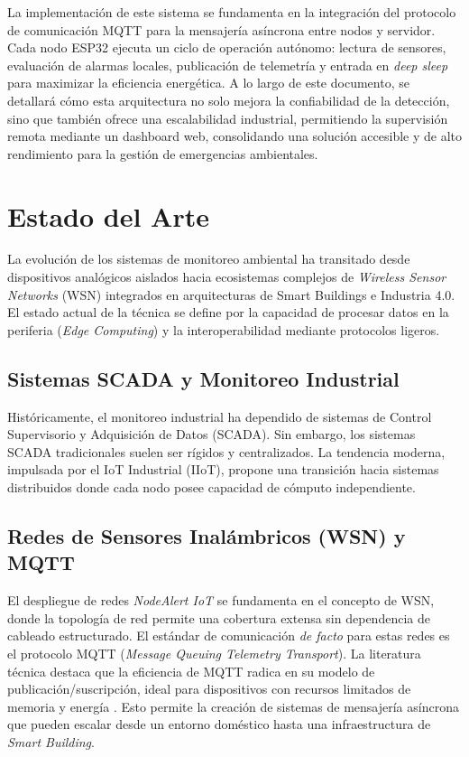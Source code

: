 \documentclass[11pt,a4paper]{article}
\begin{document}
La implementación de este sistema se fundamenta en la integración del protocolo de comunicación MQTT para la mensajería asíncrona entre nodos y servidor. Cada nodo ESP32 ejecuta un ciclo de operación autónomo: lectura de sensores, evaluación de alarmas locales, publicación de telemetría y entrada en \textit{deep sleep} para maximizar la eficiencia energética. A lo largo de este documento, se detallará cómo esta arquitectura no solo mejora la confiabilidad de la detección, sino que también ofrece una escalabilidad industrial, permitiendo la supervisión remota mediante un dashboard web, consolidando una solución accesible y de alto rendimiento para la gestión de emergencias ambientales.

\section{Estado del Arte}
La evolución de los sistemas de monitoreo ambiental ha transitado desde dispositivos analógicos aislados hacia ecosistemas complejos de \textit{Wireless Sensor Networks} (WSN) integrados en arquitecturas de Smart Buildings e Industria 4.0. El estado actual de la técnica se define por la capacidad de procesar datos en la periferia (\textit{Edge Computing}) y la interoperabilidad mediante protocolos ligeros.

\subsection{Sistemas SCADA y Monitoreo Industrial}
Históricamente, el monitoreo industrial ha dependido de sistemas de Control Supervisorio y Adquisición de Datos (SCADA). Sin embargo, los sistemas SCADA tradicionales suelen ser rígidos y centralizados. La tendencia moderna, impulsada por el IoT Industrial (IIoT), propone una transición hacia sistemas distribuidos donde cada nodo posee capacidad de cómputo independiente.

\subsection{Redes de Sensores Inalámbricos (WSN) y MQTT}
El despliegue de redes \textit{NodeAlert IoT} se fundamenta en el concepto de WSN, donde la topología de red permite una cobertura extensa sin dependencia de cableado estructurado. El estándar de comunicación \textit{de facto} para estas redes es el protocolo MQTT (\textit{Message Queuing Telemetry Transport}). La literatura técnica destaca que la eficiencia de MQTT radica en su modelo de publicación/suscripción, ideal para dispositivos con recursos limitados de memoria y energía \citep{mazidi2014}. Esto permite la creación de sistemas de mensajería asíncrona que pueden escalar desde un entorno doméstico hasta una infraestructura de \textit{Smart Building}.
\end{document}
